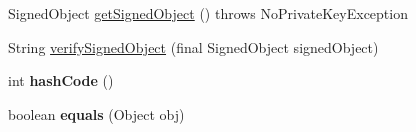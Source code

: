 \begin{DoxyCompactItemize}
\item 
Signed\-Object \hyperlink{classgov_1_1fnal_1_1ppd_1_1dd_1_1xml_1_1MessageCarrierXML_aa53b5d94167cef2629d3ecb42536f082}{get\-Signed\-Object} ()  throws No\-Private\-Key\-Exception 
\item 
String \hyperlink{classgov_1_1fnal_1_1ppd_1_1dd_1_1xml_1_1MessageCarrierXML_a0503195a0bebdaf84f272bf8391ca9d3}{verify\-Signed\-Object} (final Signed\-Object signed\-Object)
\item 
\hypertarget{classgov_1_1fnal_1_1ppd_1_1dd_1_1xml_1_1MessageCarrierXML_a368a6b8cd9cf489cc39f1363d4a1ae09}{int {\bfseries hash\-Code} ()}\label{classgov_1_1fnal_1_1ppd_1_1dd_1_1xml_1_1MessageCarrierXML_a368a6b8cd9cf489cc39f1363d4a1ae09}

\item 
\hypertarget{classgov_1_1fnal_1_1ppd_1_1dd_1_1xml_1_1MessageCarrierXML_a0a0260f54210a02fc3589ea588b06815}{boolean {\bfseries equals} (Object obj)}\label{classgov_1_1fnal_1_1ppd_1_1dd_1_1xml_1_1MessageCarrierXML_a0a0260f54210a02fc3589ea588b06815}

\end{DoxyCompactItemize}

